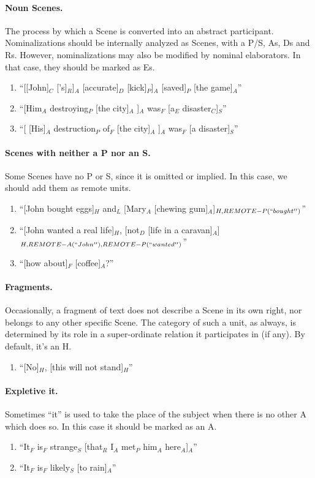 \documentclass[11pt]{article}
\newcommand{\be}{\begin{enumerate}}
\newcommand{\ee}{\end{enumerate}}
\begin{document}
\paragraph{Noun Scenes.} The process by which a Scene is converted into an abstract participant. Nominalizations should be internally analyzed as Scenes, with a P/S, As, Ds and Rs. However, nominalizations may also be modified by nominal elaborators. In that case, they should be marked as Es.
\be
\item
``[[John]$_C$ ['s]$_R$]$_A$ [accurate]$_D$ [kick]$_P$]$_A$ [saved]$_P$ [the game]$_A$''
\item
``[Him$_A$ destroying$_P$ [the city]$_A$ ]$_A$ was$_F$ [a$_E$ disaster$_C$]$_S$''
\item
``[ [His]$_A$ destruction$_P$ of$_F$ [the city]$_A$ ]$_A$ was$_F$ [a disaster]$_S$''
\ee

\paragraph{Scenes with neither a P nor an S.} Some Scenes have no P or S, since it is omitted or implied. In this case, we should add them as remote units.

\be
\item
``[John bought eggs]$_H$ and$_L$ [Mary$_A$ [chewing gum]$_A$]$_{H,REMOTE-P(``bought'')}$''
\item
``[John wanted a real life]$_H$, [not$_D$ [life in a caravan]$_A$]$_{H,REMOTE-A(``John''),REMOTE-P(``wanted'')}$''
\item
``[how about]$_F$ [coffee]$_A$?''
\ee


\paragraph{Fragments.} Occasionally, a fragment of text does not describe a Scene in its own right, nor belongs to any other specific Scene. The category of such a unit, as always, is determined by its role in a super-ordinate relation it participates in (if any). By default, it's an H.
\be
\item
``[No]$_H$, [this will not stand]$_H$''
\ee

\paragraph{Expletive it.} Sometimes ``it'' is used to take the place of the subject when there is no other A which does so. In this case it should be marked as an A.
\be
\item
``It$_F$ is$_F$ strange$_S$ [that$_R$ I$_A$ met$_P$ him$_A$ here$_A$]$_A$''
\item
``It$_F$ is$_F$ likely$_S$ [to rain]$_A$''
\ee
\end{document}
